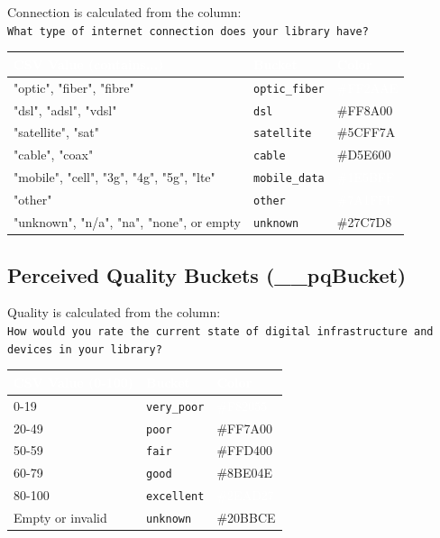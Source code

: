 \documentclass[11pt,a4paper]{article}
\begin{document}
Connection is calculated from the column:\\
\texttt{What type of internet connection does your library have?}

\begin{longtable}{|p{6cm}|p{3cm}|p{3cm}|}
\hline
\rowcolor{headerblue}\textcolor{white}{\textbf{CSV Value (contains...)}} & \textcolor{white}{\textbf{Bucket}} & \textcolor{white}{\textbf{Color}} \\
\hline
"optic", "fiber", "fibre" & \texttt{optic\_fiber} & \cellcolor{pink-bucket}\textcolor{white}{\#FF2AAE} \\
\hline
"dsl", "adsl", "vdsl" & \texttt{dsl} & \cellcolor{dsl-orange}\#FF8A00 \\
\hline
"satellite", "sat" & \texttt{satellite} & \cellcolor{satellite-green}\#5CFF7A \\
\hline
"cable", "coax" & \texttt{cable} & \cellcolor{cable-yellow}\#D5E600 \\
\hline
"mobile", "cell", "3g", "4g", "5g", "lte" & \texttt{mobile\_data} & \cellcolor{mobile-blue}\textcolor{white}{\#1E5BFF} \\
\hline
"other" & \texttt{other} & \cellcolor{other-purple}\textcolor{white}{\#7A1FFF} \\
\hline
"unknown", "n/a", "na", "none", or empty & \texttt{unknown} & \cellcolor{unknown-cyan}\#27C7D8 \\
\hline
\end{longtable}

\subsection{Perceived Quality Buckets (\_\_pqBucket)}

Quality is calculated from the column:\\
\texttt{How would you rate the current state of digital infrastructure and devices in your library?}

\begin{longtable}{|p{4cm}|p{3cm}|p{3cm}|}
\hline
\rowcolor{headerblue}\textcolor{white}{\textbf{CSV Value (0-100)}} & \textcolor{white}{\textbf{Bucket}} & \textcolor{white}{\textbf{Color}} \\
\hline
0-19 & \texttt{very\_poor} & \cellcolor{red-bucket}\textcolor{white}{\#F82055} \\
\hline
20-49 & \texttt{poor} & \cellcolor{poor-orange}\#FF7A00 \\
\hline
50-59 & \texttt{fair} & \cellcolor{fair-yellow}\#FFD400 \\
\hline
60-79 & \texttt{good} & \cellcolor{good-green}\#8BE04E \\
\hline
80-100 & \texttt{excellent} & \cellcolor{excellent-green}\textcolor{white}{\#2EAD27} \\
\hline
Empty or invalid & \texttt{unknown} & \cellcolor{cyan-bucket}\#20BBCE \\
\hline
\end{longtable}
\end{document}
